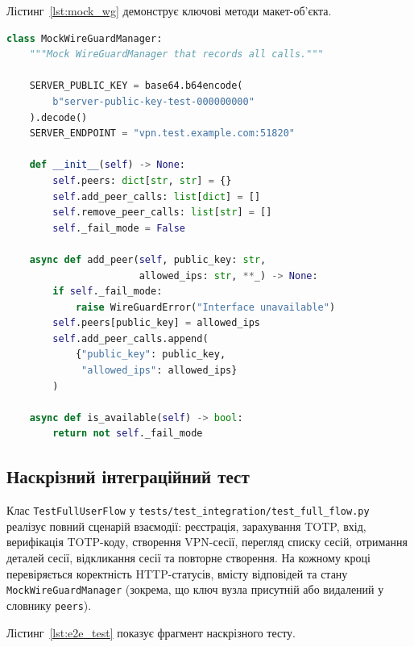 Лістинг~\ref{lst:mock_wg} демонструє ключові методи макет-об'єкта.

\begin{lstlisting}[style=mystyle, language=Python,
  caption={MockWireGuardManager: макет WireGuard для тестів},
  label={lst:mock_wg}]
class MockWireGuardManager:
    """Mock WireGuardManager that records all calls."""

    SERVER_PUBLIC_KEY = base64.b64encode(
        b"server-public-key-test-000000000"
    ).decode()
    SERVER_ENDPOINT = "vpn.test.example.com:51820"

    def __init__(self) -> None:
        self.peers: dict[str, str] = {}
        self.add_peer_calls: list[dict] = []
        self.remove_peer_calls: list[str] = []
        self._fail_mode = False

    async def add_peer(self, public_key: str,
                       allowed_ips: str, **_) -> None:
        if self._fail_mode:
            raise WireGuardError("Interface unavailable")
        self.peers[public_key] = allowed_ips
        self.add_peer_calls.append(
            {"public_key": public_key,
             "allowed_ips": allowed_ips}
        )

    async def is_available(self) -> bool:
        return not self._fail_mode
\end{lstlisting}

\subsection{Наскрізний інтеграційний тест}

Клас \texttt{TestFullUserFlow} у \texttt{tests/test\_integration/test\_full\_flow.py}
реалізує повний сценарій взаємодії: реєстрація, зарахування TOTP, вхід,
верифікація TOTP-коду, створення VPN-сесії, перегляд списку сесій,
отримання деталей сесії, відкликання сесії та повторне створення.
На кожному кроці перевіряється коректність HTTP-статусів, вмісту відповідей
та стану \texttt{MockWireGuardManager} (зокрема, що ключ вузла присутній
або видалений у словнику \texttt{peers}).

Лістинг~\ref{lst:e2e_test} показує фрагмент наскрізного тесту.

